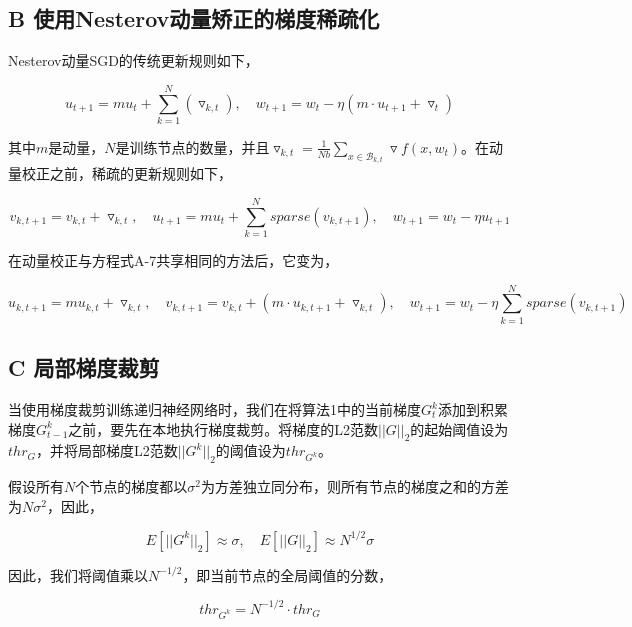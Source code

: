 \subsection{B 使用Nesterov动量矫正的梯度稀疏化}
Nesterov动量SGD的传统更新规则如下，

\begin{equation}
	\label{eq:nsgd}
	u_{t+1} = mu_{t}+ \sum_{k=1}^{N}\left( \triangledown_{k,t}\right),\quad  w_{t+1} = w_{t} - \eta \left(m\cdot u_{t+1} + \triangledown_{t}\right)
\end{equation}

其中$m$是动量，$N$是训练节点的数量，并且$\triangledown_{k,t} =  \frac{1}{Nb} \sum_{x \in \mathcal{B}_{k, t}} \triangledown f(x, w_{t})$。在动量校正之前，稀疏的更新规则如下，

\begin{equation}
	\label{eq:nonc}
	v_{k,t+1} = v_{k,t} + \triangledown_{k,t},\quad u_{t+1} = mu_{t} + \sum_{k=1}^{N} sparse\left( v_{k,t+1}\right) ,\quad  w_{t+1} = w_{t} - \eta u_{t+1}
\end{equation}

在动量校正与方程式A-7共享相同的方法后，它变为，

\begin{equation}
	\label{eq:nc}
	u_{k,t+1} = mu_{k,t}+ \triangledown_{k,t},\quad  v_{k,t+1} = v_{k,t} + \left(m\cdot u_{k,t+1} + \triangledown_{k,t}\right),\quad  w_{t+1} = w_{t} - \eta \sum_{k=1}^{N} sparse\left( v_{k,t+1}\right) 
\end{equation}

\subsection{C 局部梯度裁剪}
当使用梯度裁剪训练递归神经网络时，我们在将算法1中的当前梯度$G^k_t$添加到积累梯度$G^k_{t-1}$之前，要先在本地执行梯度裁剪。将梯度的L2范数$||G||_2$的起始阈值设为$thr_G$，并将局部梯度L2范数$||G^k||_2$的阈值设为$thr_{G^k}$。

假设所有$N$个节点的梯度都以$\sigma^2$为方差独立同分布，则所有节点的梯度之和的方差为$N\sigma^2$，因此，

\begin{equation}
  E\left[ ||G^k||_2 \right]\approx \sigma, \quad E\left[ ||G||_2 \right]\approx N^{1/2} \sigma
\end{equation}

因此，我们将阈值乘以$N^{-1/2}$，即当前节点的全局阈值的分数，

\begin{equation}
  thr_{G^k} = N^{-1/2}\cdot thr_{G}
\end{equation}

